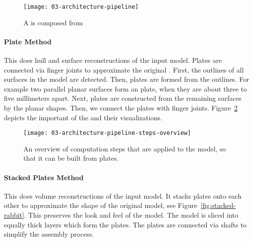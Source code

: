 \documentclass[../../ClassicThesis.tex]{subfiles}
\begin{document}
\begin{figure}[h]
\centering
\texttt{[image: 03-architecture-pipeline]}
\caption{A  is composed from
  }
\label{fig:pipeline-from-steps}
\end{figure}

\paragraph{Plate Method}

This \class{\fabmethod} does hull and surface
reconstructions of the input model. Plates are connected via
finger joints to approximate the original {\threedmodel}.
First, the outlines of all surfaces in the model are
detected. Then, plates are formed from the outlines. For
example two parallel planar surfaces form an 
plate, when they are about three to five millimeters apart.
Next, plates are constructed from the remaining surfaces by
 the planar shapes. Then, we connect the
plates with finger joints.
Figure~\ref{fig:overview-plate-steps} depicts the important
 of the  and their
visualizations.


\begin{figure}[h]
  \centering
  \texttt{[image: 03-architecture-pipeline-steps-overview]}
  \caption{An overview of computation steps that are applied
    to the model, so that it can be built from plates.}
  \label{fig:overview-plate-steps}
\end{figure}

\paragraph{Stacked Plates Method}

This \class{\fabmethod} does volume reconstructions of the
input model. It stacks plates onto each other to approximate
the shape of the original model, see
Figure~\ref{fig:stacked-rabbit}. This preserves the look and
feel of the model. The model is sliced into equally thick
layers which form the plates. The plates are connected via
shafts to simplify the assembly process.
\end{document}
